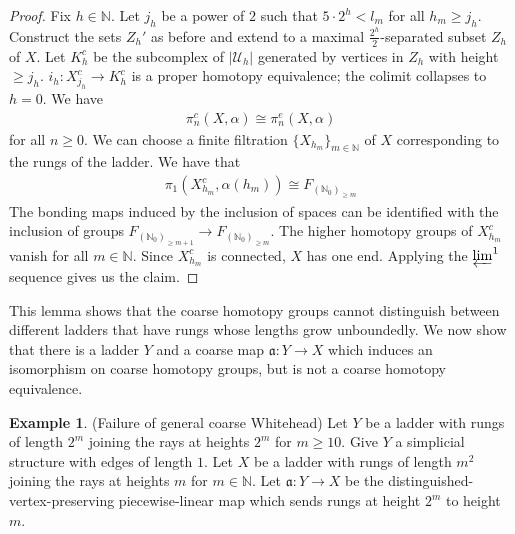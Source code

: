 \documentclass[a4paper,11pt]{article}
\theoremstyle{definition}
\newtheorem{example}[definition]{Example}
\theoremstyle{plain}
\theoremstyle{remark}
\begin{document}
{\begin{proof} Fix $h\in \mathbb{N}$. Let $j_{h}$ be a power of $2$ such that $5\cdot 2^h < l_{m}$ for all $h_{m}\geq j_{h}$. Construct the sets $Z_{h}'$ as before and extend to a maximal $\frac{2^h}{2}$-separated subset $Z_{h}$ of $X$. Let $K^c_{h}$ be the subcomplex of $|\mathcal{U}_{h}|$ generated by vertices in $Z_{h}$ with height $\geq j_{h}$. $i_{h}: X^c_{j_h} \rightarrow K^c_{h}$ is a proper homotopy equivalence; the colimit collapses to $h=0$. We have
\begin{align*}
\pi_{n}^c(X,\alpha) \cong \pi_{n}^e(X,\alpha)
\end{align*}
for all $n\geq 0$. We can choose a finite filtration $\{X_{h_{m}}\}_{m\in \mathbb{N}}$ of $X$ corresponding to the rungs of the ladder. We have that 
\begin{align*}
\pi_{1}(X^c_{h_{m}}, \alpha(h_{m})) \cong F_{(\mathbb{N}_{0})_{\geq m}}
\end{align*}
The bonding maps induced by the inclusion of spaces can be identified with the inclusion of groups $F_{(\mathbb{N}_{0})_{\geq m+1}}\rightarrow F_{(\mathbb{N}_{0})_{\geq m}}$. The higher homotopy groups of $X^c_{h_{m}}$ vanish for all $m\in \mathbb{N}$. Since $X^c_{h_{m}}$ is connected, $X$ has one end. Applying the ${\varprojlim}^1$ sequence gives us the claim. 
\end{proof}

This lemma shows that the coarse homotopy groups cannot distinguish between different ladders that have rungs whose lengths grow unboundedly. We now show that there is a ladder $Y$ and a coarse map $\mathfrak{a}: Y\rightarrow X$ which induces an isomorphism on coarse homotopy groups, but is not a coarse homotopy equivalence.  

\begin{example} (Failure of general coarse Whitehead) Let $Y$ be a ladder with rungs of length $2^{m}$ joining the rays at heights $2^{m}$ for $m\geq 10$. Give $Y$ a simplicial structure with edges of length $1$.  Let $X$ be a ladder with rungs of length $m^2$ joining the rays at heights $m$ for $m\in \mathbb{N}$. Let $\mathfrak{a}: Y\rightarrow X$ be the distinguished-vertex-preserving piecewise-linear map which sends rungs at height $2^{m}$ to height $m$. \\


\end{example}}
\end{document}
